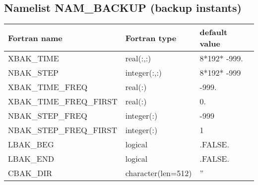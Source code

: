 \subsection{Namelist NAM\_BACKUP (backup instants)}\label{s:nambackup}

\begin{center}
\begin{tabular} {|l|l|l|}
\hline
Fortran name & Fortran type & default value \\
\hline
XBAK\_TIME              & real(:,:)          & 8*192* -999. \\
NBAK\_STEP              & integer(:,:)       & 8*192* -999  \\
XBAK\_TIME\_FREQ        & real(:)            & -999.        \\
XBAK\_TIME\_FREQ\_FIRST & real(:)            & 0.           \\
NBAK\_STEP\_FREQ        & integer(:)         & -999         \\
NBAK\_STEP\_FREQ\_FIRST & integer(:)         & 1            \\
LBAK\_BEG               & logical            & .FALSE.      \\
LBAK\_END               & logical            & .FALSE.      \\
CBAK\_DIR               & character(len=512) & ''           \\
\hline
\end{tabular}
\end{center}


